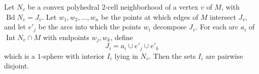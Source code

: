 Let $N_v$ be a convex polyhedral 2-cell neighborhood of a vertex $v$ of $M$, with $\operatorname{Bd} N_v = J_v$. Let $w_1, w_2, \ldots, w_n$ be the points at which edges of $M$ intersect $J_v$, and let $e'_j$ be the arcs into which the points $w_i$ decompose $J_v$. For each arc $a_i$ of $\operatorname{Int} N_v \cap M$ with endpoints $w_j, w_k$, define
$$J_i = a_i \cup e'_j \cup e'_k$$
which is a $1$-sphere with interior $I_i$ lying in $N_v$. Then the sets $I_i$ are pairwise disjoint.
